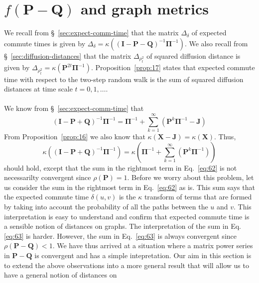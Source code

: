 \section{$f(\mathbf{P} - \mathbf{Q})$ and graph metrics}
\label{sec:graph-metr-funct}
We recall from \S~\ref{sec:expect-comm-time} that the matrix
$\Delta_{\delta}$ of expected commute times is given by
$\Delta_{\delta} = \kappa((\mathbf{I} - \mathbf{P} -
\mathbf{Q})^{-1}\bm{\Pi}^{-1})$. We also recall from
\S~\ref{sec:diffusion-distances} that the matrix
$\Delta_{\rho_{t}^{2}}$ of squared diffusion distance is given by
$\Delta_{\rho_{t}^{2}} =
\kappa(\mathbf{P}^{2t}\bm{\Pi}^{-1})$. Proposition~\ref{prop:17}
states that expected commute time with respect to the two-step random
walk is the sum of squared diffusion distances at time scale
$t=0,1,\dots$. \\
\\
\noindent
We know from \S~\ref{sec:expect-comm-time} that
\begin{equation}
\label{eq:63}
  (\mathbf{I} - \mathbf{P} + \mathbf{Q})^{-1}\bm{\Pi}^{-1}  = \bm{\Pi}^{-1} +
  \sum_{k=1}^{\infty}{(\mathbf{P}^{k}\bm{\Pi}^{-1} - \mathbf{J})}
\end{equation}
From Proposition~\ref{prop:16} we also know that $\kappa(\mathbf{X} -
\mathbf{J}) = \kappa(\mathbf{X})$. Thus,
\begin{equation}
  \label{eq:62}
  \kappa((\mathbf{I} - \mathbf{P} + \mathbf{Q})^{-1}\bm{\Pi}^{-1}) = 
  \kappa(\bm{\Pi}^{-1} + \sum_{k=1}^{\infty}{(\mathbf{P}^{k}\bm{\Pi}^{-1})})
\end{equation}
should hold, except that the sum in the rightmost term in
Eq.~\eqref{eq:62} is not necessarilty convergent since
$\rho(\mathbf{P}) = 1$. Before we worry about this problem, let us
consider the sum in the rightmost term in Eq.~\eqref{eq:62} as is. This sum
says that the expected commute time $\delta(u,v)$ is the
$\kappa$ transform of terms that are formed by taking into account the
probability of all the paths between the $u$ and $v$. This
interpretation is easy to understand and confirm that
expected commute time is a sensible notion of distances on graphs. The
interpretation of the sum in Eq. \eqref{eq:63} is harder.  However,
the sum in Eq.~\eqref{eq:63} is always convergent since
$\rho(\mathbf{P} - \mathbf{Q}) < 1$. We have thus arrived at a
situation where a matrix power series in $\mathbf{P} - \mathbf{Q}$ is
convergent and has a simple intepretation. Our aim in this section is
to extend the above observations into a more general result that will
allow us to have a general notion of distances on
